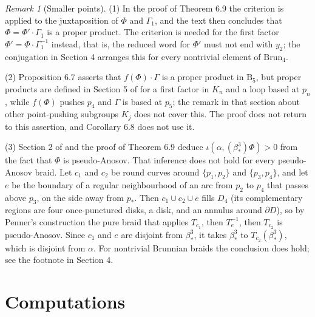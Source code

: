 \documentclass[11pt]{amsart}
\theoremstyle{remark}
\newtheorem{remark}[lemma]{Remark}
\newcommand{\B}{\mathrm{B}}
\newcommand{\Brun}{\mathrm{Brun}}
\newcommand{\bs}{\beta^3_*}
\begin{document}
\begin{remark}[Smaller points]\label{rem:small}
(1) In the proof of Theorem 6.9 the criterion is applied to the juxtaposition of $\Phi$ and $\Gamma_1$, and the text then concludes that $\Phi=\Phi'\cdot\Gamma_1$ is a proper product. The criterion is needed for the first factor $\Phi'=\Phi\cdot\Gamma_1^{-1}$ instead, that is, the reduced word for $\Phi'$ must not end with $y_2$; the conjugation in Section 4 arranges this for every nontrivial element of $\Brun_4$.

(2) Proposition 6.7 asserts that $f(\Phi)\cdot\Gamma$ is a proper product in $\B_5$, but proper products are defined in Section 5 of \cite{BBB} for a first factor in $K_n$ and a loop based at $p_n$, while $f(\Phi)$ pushes $p_4$ and $\Gamma$ is based at $p_5$; the remark in that section about other point-pushing subgroups $K_j$ does not cover this. The proof does not return to this assertion, and Corollary 6.8 does not use it.

(3) Section 2 of \cite{BBB} and the proof of Theorem 6.9 deduce $\iota(\alpha,(\bs)\Phi)>0$ from the fact that $\Phi$ is pseudo-Anosov. That inference does not hold for every pseudo-Anosov braid. Let $c_1$ and $c_2$ be round curves around $\{p_1,p_2\}$ and $\{p_3,p_4\}$, and let $e$ be the boundary of a regular neighbourhood of an arc from $p_2$ to $p_4$ that passes above $p_3$, on the side away from $p_*$. Then $c_1\cup c_2\cup e$ fills $D_4$ (its complementary regions are four once-punctured disks, a disk, and an annulus around $\partial D$), so by Penner's construction \cite{Pen} the pure braid that applies $T_{c_1}$, then $T_e^{-1}$, then $T_{c_2}$ is pseudo-Anosov. Since $c_1$ and $e$ are disjoint from $\bs$, it takes $\bs$ to $T_{c_2}(\bs)$, which is disjoint from $\alpha$. For nontrivial Brunnian braids the conclusion does hold; see the footnote in Section 4.
\end{remark}

\appendix
\section{Computations}
\end{document}

